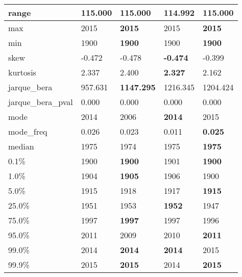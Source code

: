 \begin{table}[H]
\begin{tabular}{|l|m{10em}|m{10em}|m{10em}|m{10em}|}
\hline range & 115.000 & \bfseries 115.000 & \cellcolor[rgb]{0.9, 0.54, 0.52} 114.992 & \bfseries 115.000 \\
\hline max & 2015 & \bfseries 2015 & \cellcolor[rgb]{0.9, 0.54, 0.52} 2015 & \bfseries 2015 \\
\hline min & 1900 & \bfseries 1900 & \cellcolor[rgb]{0.9, 0.54, 0.52} 1900 & \bfseries 1900 \\
\hline skew & -0.472 & -0.478 & \bfseries -0.474 & \cellcolor[rgb]{0.9, 0.54, 0.52} -0.399 \\
\hline kurtosis & 2.337 & 2.400 & \bfseries 2.327 & \cellcolor[rgb]{0.9, 0.54, 0.52} 2.162 \\
\hline jarque\_bera & 957.631 & \bfseries 1147.295 & \cellcolor[rgb]{0.9, 0.54, 0.52} 1216.345 & 1204.424 \\
\hline jarque\_bera\_pval & 0.000 & 0.000 & 0.000 & 0.000 \\
\hline mode & 2014 & \cellcolor[rgb]{0.9, 0.54, 0.52} 2006 & \bfseries 2014 & 2015 \\
\hline mode\_freq & 0.026 & 0.023 & \cellcolor[rgb]{0.9, 0.54, 0.52} 0.011 & \bfseries 0.025 \\
\hline median & 1975 & \cellcolor[rgb]{0.9, 0.54, 0.52} 1974 & 1975 & \bfseries 1975 \\
\hline 0.1\% & 1900 & \bfseries 1900 & \cellcolor[rgb]{0.9, 0.54, 0.52} 1901 & \bfseries 1900 \\
\hline 1.0\% & 1904 & \bfseries 1905 & 1906 & \cellcolor[rgb]{0.9, 0.54, 0.52} 1900 \\
\hline 5.0\% & 1915 & \cellcolor[rgb]{0.9, 0.54, 0.52} 1918 & 1917 & \bfseries 1915 \\
\hline 25.0\% & 1951 & 1953 & \bfseries 1952 & \cellcolor[rgb]{0.9, 0.54, 0.52} 1947 \\
\hline 75.0\% & 1997 & \bfseries 1997 & 1997 & \cellcolor[rgb]{0.9, 0.54, 0.52} 1996 \\
\hline 95.0\% & 2011 & \cellcolor[rgb]{0.9, 0.54, 0.52} 2009 & 2010 & \bfseries 2011 \\
\hline 99.0\% & 2014 & \bfseries 2014 & \bfseries 2014 & \cellcolor[rgb]{0.9, 0.54, 0.52} 2015 \\
\hline 99.9\% & 2015 & \bfseries 2015 & \cellcolor[rgb]{0.9, 0.54, 0.52} 2014 & \bfseries 2015 \\
\hline
\end{tabular}
\end{table}
